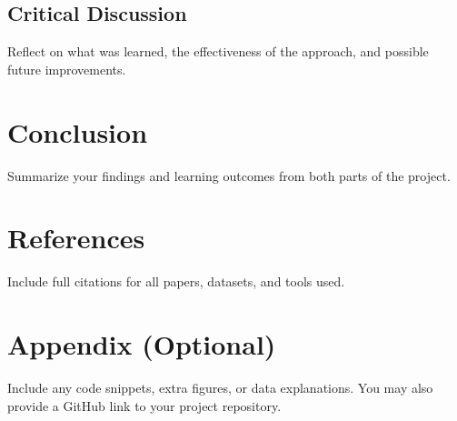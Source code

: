 \documentclass[12pt]{article}
\begin{document}
\subsection{Critical Discussion}
Reflect on what was learned, the effectiveness of the approach, and possible future improvements.


\section{Conclusion}
Summarize your findings and learning outcomes from both parts of the project.

\section*{References}
Include full citations for all papers, datasets, and tools used.

\section*{Appendix (Optional)}
Include any code snippets, extra figures, or data explanations. You may also provide a GitHub link to your project repository.
\end{document}
